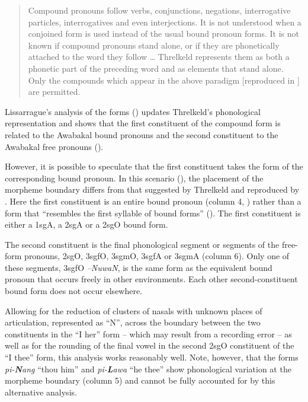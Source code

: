 \begin{quote}
    Compound pronouns follow verbs, conjunctions, negations, interrogative particles, interrogatives and even interjections. It is not understood when a conjoined form is used instead of the usual bound pronoun forms. It is not known if compound pronouns stand alone, or if they are phonetically attached to the word they follow … Threlkeld represents them as both a phonetic part of the preceding word and as elements that stand alone. Only the compounds which appear in the above paradigm [reproduced in ] are permitted. \citep[47--48]{lissarrague_salvage_2006}
\end{quote}

Lissarrague’s analysis of the forms () updates Threlkeld’s phonological representation and shows that the first constituent of the compound form is related to the Awabakal bound pronouns and the second constituent to the Awabakal free pronouns ().

However, it is possible to speculate that the first constituent takes the form of the corresponding bound pronoun. In this scenario (), the placement of the morpheme boundary differs from that suggested by Threlkeld and reproduced by \citet[47]{lissarrague_salvage_2006}. Here the first constituent is an entire bound pronoun (column 4, ) rather than a form that “resembles the first syllable of bound forms” (\citeyear[47]{lissarrague_salvage_2006}). The first constituent is either a 1sgA, a 2sgA or a 2sgO bound form.

The second constituent is the final phonological segment or segments of the free-form pronouns, 2sgO, 3sgfO, 3sgmO, 3sgfA or 3sgmA (column 6). Only one of these segments, 3sgfO \textit{–NuwaN}, is the same form as the equivalent bound pronoun that occurs freely in other environments. Each other second-constituent bound form does not occur elsewhere.

Allowing for the reduction of clusters of nasals with unknown places of articulation, represented as ``N'', across the boundary between the two constituents in the “I her” form – which may result from a recording error – as well as for the rounding of the final vowel in the second 2sgO constituent of the “I thee” form, this analysis works reasonably well. Note, however, that the forms \textit{pi-\textbf{N}ang} “thou him” and \textit{pi-\textbf{L}awa} “he thee” show phonological variation at the morpheme boundary (column 5) and cannot be fully accounted for by this alternative analysis.

